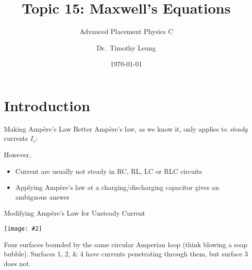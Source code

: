 \documentclass[12pt,aspectratio=169]{beamer}
\title{Topic 15: Maxwell's Equations}
\subtitle{Advanced Placement Physics C}
\author{Dr.\ Timothy Leung}
\institute{Olympiads School, Toronto, ON, Canada}
\date{\today}
\newcommand{\pic}[2]{\texttt{[image: \#2]}}
\newcommand{\eq}[2]{
  \vspace{#1}{\Large\begin{displaymath}#2\end{displaymath}}
}
\begin{document}
\begin{frame}
  \maketitle
\end{frame}


\section[Intro]{Introduction}

%



\begin{frame}{Making Amp\`{e}re's Law Better}
  Amp\`{e}re's law, as we know it, only applies to \emph{steady} currents $I_c$:

  \eq{-.1in}{
    \oint_C \bm{B}\cdot\dl\boldsymbol{\ell}=\mu_0 I_c
  }
  However,
  \begin{itemize}
  \item Current are usually not steady in RC, RL, LC or RLC circuits
  \item Applying Amp\`{e}re's law at a charging/discharging capacitor gives an
    ambiguous answer
  \end{itemize}
\end{frame}



\begin{frame}{Modifying Amp\`{e}re's Law for Unsteady Current}
  \begin{center}
    \pic{.3}{mag_displacement_fig3}
  \end{center}
  Four surfaces bounded by the same circular Amperian loop
  (think blowing a soap bubble). Surfaces \numlist{1;2;4} have currents
  penetrating through them, but surface \num{3} does not.
\end{frame}
\end{document}
